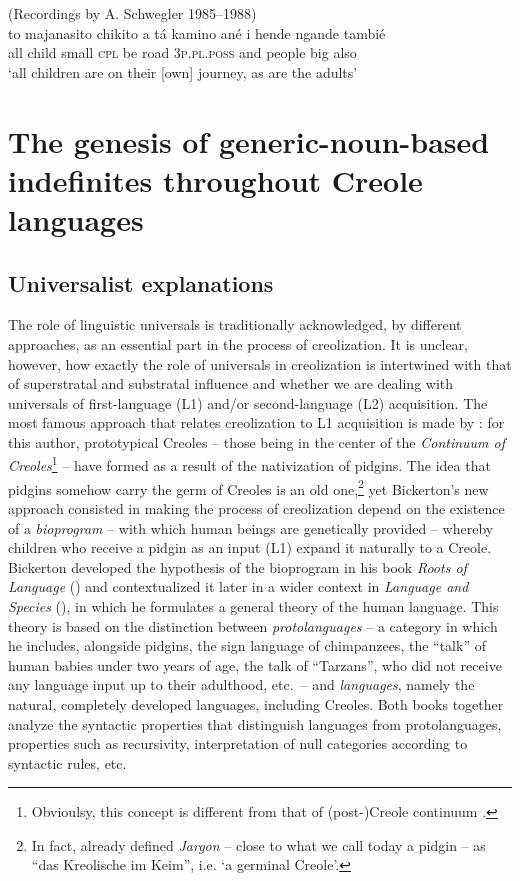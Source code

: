 \documentclass[output=paper,colorlinks,citecolor=brown]{langscibook}
\begin{document}
\pagebreak
\ea\label{ex:gut24}(Recordings by A. Schwegler 1985--1988)\\
\gll to majanasito chikito a tá kamino ané i hende ngande tambié \\
all child small \textsc{cpl} be road 3\textsc{p.pl.poss} and people big also \\
\glt ‘all children are on their [own] journey, as are the adults’
\z



\section{The genesis of generic-noun-based indefinites throughout Creole languages}\label{sec:gut3}

\subsection{Universalist explanations}\label{sec:gut3.1}

The role of linguistic universals is traditionally acknowledged, by different approaches, as an essential part in the process of creolization. It is unclear, however, how exactly the role of universals in creolization is intertwined with that of superstratal and substratal influence and whether we are dealing with universals of first-language (L1) and/or second-language (L2) acquisition. The most famous approach that relates creolization to L1 acquisition is made by \citeauthor{Bickerton2016}: for this author, prototypical Creoles -- those being in the center of the \textit{Continuum of Creoles}\footnote{Obvioulsy, this concept is different from that of (post-)Creole continuum \citep{DeCamp1971}.}  \citep[][vii--viii]{Bickerton2016} -- have formed as a result of the nativization of pidgins. The idea that pidgins somehow carry the germ of Creoles is an old one,\footnote{In fact, \citet[215]{Schuchardt1888} already defined \textit{Jargon} -- close to what we call today a pidgin -- as “das Kreolische im Keim”, i.e. ‘a germinal Creole’.} yet Bickerton’s new approach consisted in making the process of creolization depend on the existence of a \textit{bioprogram} -- with which human beings are genetically provided -- whereby children who receive a pidgin as an input (L1) expand it naturally to a Creole. Bickerton developed the hypothesis of the bioprogram in his book \textit{Roots of Language} (\citeyear{Bickerton2016}) and contextualized it later in a wider context in \textit{Language and Species} (\citeyear{Bickerton1990}), in which he formulates a general theory of the human language. This theory is based on the distinction between \textit{protolanguages} -- a category in which he includes, alongside pidgins, the sign language of chimpanzees, the “talk” of human babies under two years of age, the talk of “Tarzans”, who did not receive any language input up to their adulthood, etc.~-- and \textit{languages}, namely the natural, completely developed languages, including Creoles. Both books together analyze the syntactic properties that distinguish languages from protolanguages, properties such as recursivity, interpretation of null categories according to syntactic rules, etc.
\end{document}
